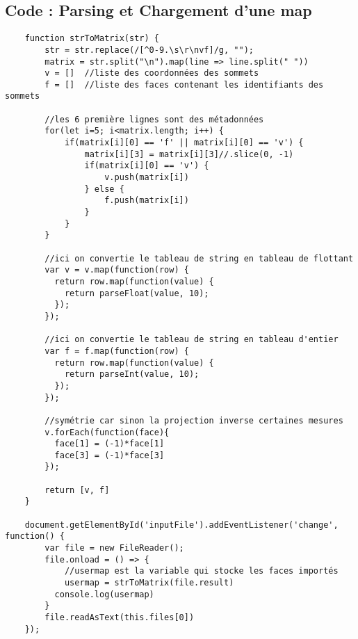 \clearpage
\subsection{Code : Parsing et Chargement d'une map}
\begin{verbatim}
    function strToMatrix(str) {
        str = str.replace(/[^0-9.\s\r\nvf]/g, "");
        matrix = str.split("\n").map(line => line.split(" "))
        v = []  //liste des coordonnées des sommets
        f = []  //liste des faces contenant les identifiants des sommets

        //les 6 première lignes sont des métadonnées
        for(let i=5; i<matrix.length; i++) {
            if(matrix[i][0] == 'f' || matrix[i][0] == 'v') {
                matrix[i][3] = matrix[i][3]//.slice(0, -1)
                if(matrix[i][0] == 'v') {
                    v.push(matrix[i])
                } else {
                    f.push(matrix[i])
                }
            }
        }

        //ici on convertie le tableau de string en tableau de flottant
        var v = v.map(function(row) {
          return row.map(function(value) {
            return parseFloat(value, 10);
          });
        });

        //ici on convertie le tableau de string en tableau d'entier
        var f = f.map(function(row) {
          return row.map(function(value) {
            return parseInt(value, 10);
          });
        });

        //symétrie car sinon la projection inverse certaines mesures
        v.forEach(function(face){
          face[1] = (-1)*face[1]
          face[3] = (-1)*face[3]
        });
    
        return [v, f]
    }
    
    document.getElementById('inputFile').addEventListener('change', function() {
        var file = new FileReader();
        file.onload = () => {
            //usermap est la variable qui stocke les faces importés
            usermap = strToMatrix(file.result) 
          console.log(usermap)
        }
        file.readAsText(this.files[0])
    });
\end{verbatim}

\clearpage
